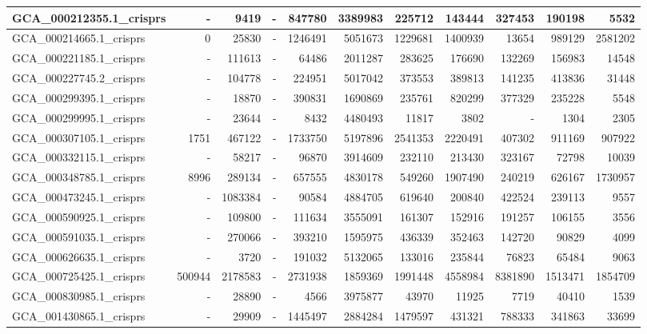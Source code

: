 \documentclass[12pt,a4paper]{article}
\begin{document}
\begin{table}[ht]
\begin{center}
\begin{tabular}{|l*{10}{|r}|}
GCA\_000212355.1\_crisprs & - & 9419 & - & 847780 & 3389983 & 225712 & 143444 & 327453 & 190198 & 5532 \\ \hline
GCA\_000214665.1\_crisprs & 0 & 25830 & - & 1246491 & 5051673 & 1229681 & 1400939 & 13654 & 989129 & 2581202 \\ \hline
GCA\_000221185.1\_crisprs & - & 111613 & - & 64486 & 2011287 & 283625 & 176690 & 132269 & 156983 & 14548 \\ \hline
GCA\_000227745.2\_crisprs & - & 104778 & - & 224951 & 5017042 & 373553 & 389813 & 141235 & 413836 & 31448 \\ \hline
GCA\_000299395.1\_crisprs & - & 18870 & - & 390831 & 1690869 & 235761 & 820299 & 377329 & 235228 & 5548 \\ \hline
GCA\_000299995.1\_crisprs & - & 23644 & - & 8432 & 4480493 & 11817 & 3802 & - & 1304 & 2305 \\ \hline
GCA\_000307105.1\_crisprs & 1751 & 467122 & - & 1733750 & 5197896 & 2541353 & 2220491 & 407302 & 911169 & 907922 \\ \hline
GCA\_000332115.1\_crisprs & - & 58217 & - & 96870 & 3914609 & 232110 & 213430 & 323167 & 72798 & 10039 \\ \hline
GCA\_000348785.1\_crisprs & 8996 & 289134 & - & 657555 & 4830178 & 549260 & 1907490 & 240219 & 626167 & 1730957 \\ \hline
GCA\_000473245.1\_crisprs & - & 1083384 & - & 90584 & 4884705 & 619640 & 200840 & 422524 & 239113 & 9557 \\ \hline
GCA\_000590925.1\_crisprs & - & 109800 & - & 111634 & 3555091 & 161307 & 152916 & 191257 & 106155 & 3556 \\ \hline
GCA\_000591035.1\_crisprs & - & 270066 & - & 393210 & 1595975 & 436339 & 352463 & 142720 & 90829 & 4099 \\ \hline
GCA\_000626635.1\_crisprs & - & 3720 & - & 191032 & 5132065 & 133016 & 235844 & 76823 & 65484 & 9063 \\ \hline
GCA\_000725425.1\_crisprs & 500944 & 2178583 & - & 2731938 & 1859369 & 1991448 & 4558984 & 8381890 & 1513471 & 1854709 \\ \hline
GCA\_000830985.1\_crisprs & - & 28890 & - & 4566 & 3975877 & 43970 & 11925 & 7719 & 40410 & 1539 \\ \hline
GCA\_001430865.1\_crisprs & - & 29909 & - & 1445497 & 2884284 & 1479597 & 431321 & 788333 & 341863 & 33699 \\ \hline
\end{tabular}
\end{center}
\end{table}
\end{document}
